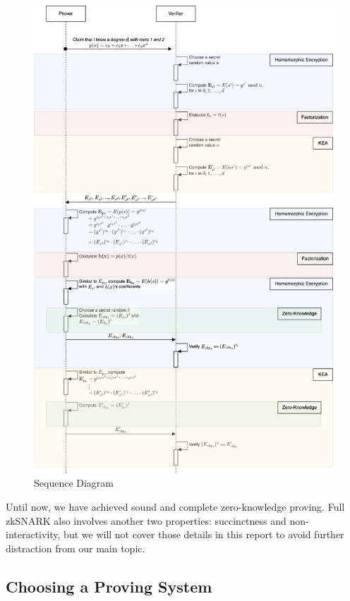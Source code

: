 \documentclass[
]{report}
\begin{document}
\begin{figure}
\centering
\includegraphics{zksnark.png}
\caption{Sequence Diagram}
\end{figure}

Until now, we have achieved sound and complete zero-knowledge proving.
Full zkSNARK also involves another two properties: succinctness
and non-interactivity, but we will not cover those details in this
report to avoid further distraction from our main topic.

\subsection{Choosing a Proving System}
\end{document}
